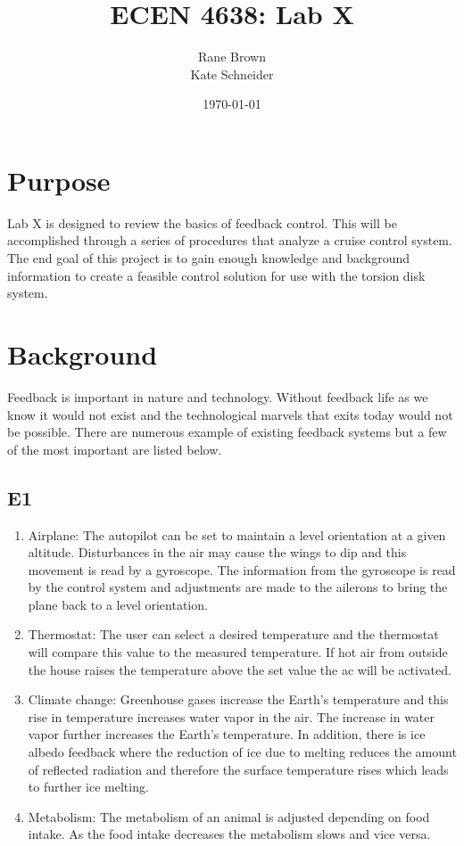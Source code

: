 \documentclass[11pt,titlepage]{article}
\author{Rane Brown \\ Kate Schneider}
\title{ECEN 4638: Lab X}
\date{\today}
\begin{document}
\maketitle

\section*{Purpose}
	Lab X is designed to review the basics of feedback control. This will be accomplished through a series of procedures that analyze a cruise control system. The end goal of this project is to gain enough knowledge and background information to create a feasible control solution for use with the torsion disk system.

\section*{Background}
	Feedback is important in nature and technology. Without feedback life as we know it would not exist and the technological marvels that exits today would not be possible. There are numerous example of existing feedback systems but a few of the most important are listed below.

	\subsection*{E1}
		\begin{enumerate}
			\item Airplane: The autopilot can be set to maintain a level orientation at a given altitude. Disturbances in the air may cause the wings to dip and this movement is read by a gyroscope. The information from the gyroscope is read by the control system and adjustments are made to the ailerons to bring the plane back to a level orientation.
			\item Thermostat: The user can select a desired temperature and the thermostat will compare this value to the measured temperature. If hot air from outside the house raises the temperature above the set value the ac will be activated. 
			\item Climate change: Greenhouse gases increase the Earth's temperature and this rise in temperature increases water vapor in the air. The increase in water vapor further increases the Earth's temperature. In addition, there is ice albedo feedback where the reduction of ice due to melting reduces the amount of reflected radiation and therefore the surface temperature rises which leads to further ice melting.
			\item Metabolism: The metabolism of an animal is adjusted depending on food intake. As the food intake decreases the metabolism slows and vice versa.
		\end{enumerate}
\end{document}
